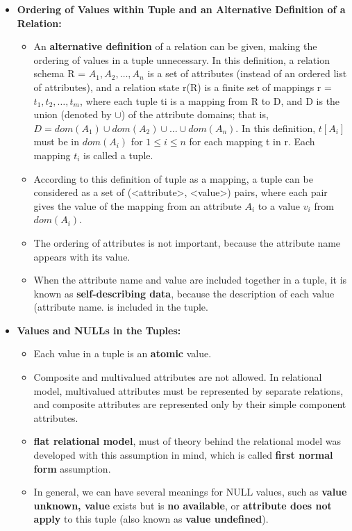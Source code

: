 \documentclass[10pt]{article}
\begin{document}
\begin{enumerate}
\begin{itemize}
		\item \textbf{Ordering of Values within Tuple and an Alternative Definition of a Relation: }
		\begin{itemize}
			\item An \textbf{alternative definition} of a relation can be given, making the ordering of values in a tuple unnecessary. In this definition, a relation schema R = ${A_1, A_2,\ldots, A_n}$ is a set of attributes (instead of an ordered list of attributes), and a relation state r(R) is a finite set of mappings r = ${t_1, t_2,\ldots, t_m}$, where each tuple ti is a mapping from R to D, and D is the union (denoted by $\cup$) of the attribute domains; that is, $D = dom(A_1) \cup dom(A_2) \cup \ldots \cup dom(A_n)$. In this definition, $t[A_i]$ must be in $dom(A_i)$ for $1 \le i \le n$ for each mapping t in r. Each mapping $t_i$ is called a tuple.
			\item According to this definition of tuple as a mapping, a tuple can be considered as a set of (<attribute>, <value>) pairs, where each pair gives the value of the mapping from an attribute $A_i$ to a value $v_i$ from $dom(A_i)$.
			\item The ordering of attributes is not important, because the attribute name appears with its value.
			\item When the attribute name and value are included together in a tuple, it is known as \textbf{self-describing data}, because the description of each value (attribute name. is included in the tuple.
		\end{itemize}

		\item \textbf{Values and NULLs in the Tuples: }
		\begin{itemize}
			\item Each value in a tuple is an \textbf{atomic} value.
			\item Composite and multivalued attributes are not allowed. In relational model, multivalued attributes must be represented by separate relations, and composite attributes are represented only by their simple component attributes.
			\item \textbf{flat relational model}, must of theory behind the relational model was developed with this assumption in mind, which is called \textbf{first normal form} assumption.
			\item In general, we can have several meanings for NULL values, such as \textbf{value unknown, value} exists but is \textbf{no available}, or \textbf{attribute does not apply} to this tuple (also known as \textbf{value undefined}).
		\end{itemize}


\end{itemize}
\end{enumerate}
\end{document}
